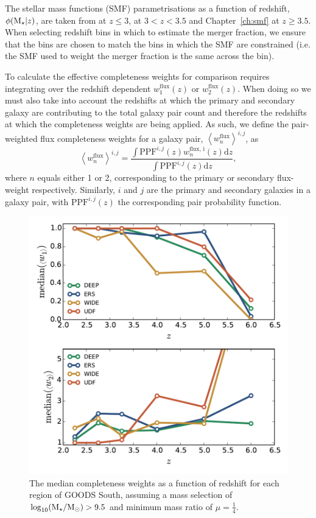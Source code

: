 The stellar mass functions (SMF) parametrisations as a function of redshift, \( \phi(\text{M}_{\star}|z) \), are taken from \citet{Mortlock:2014et} at $z \leq 3$, \citet{Santini:2012jq} at $3 < z < 3.5$ and Chapter~\ref{ch:smf} at $z \geq 3.5$. When selecting redshift bins in which to estimate the merger fraction, we ensure that the bins are chosen to match the bins in which the SMF are constrained (i.e. the SMF used to weight the merger fraction is the same across the bin).

To calculate the effective completeness weights for comparison requires integrating over the redshift dependent $w^{\text{flux}}_{1}(z)$ or $w^{\text{flux}}_{2}(z)$. When doing so we must also take into account the redshifts at which the primary and secondary galaxy are contributing to the total galaxy pair count and therefore the redshifts at which the completeness weights are being applied. As such, we define the pair-weighted flux completeness weights for a galaxy pair, $\left \langle w^{\text{flux}}_{n} \right \rangle ^{i,j}$, as
\begin{equation}
	\left \langle w^{\text{flux}}_{n} \right \rangle^{i,j} = \frac{\int \text{PPF}^{i,j}(z) w^{\text{flux, i}}_{n}(z) \text{d}z}{\int \text{PPF}^{i,j}(z) \text{d}z},
\end{equation}
where $n$ equals either 1 or 2, corresponding to the primary or secondary flux-weight respectively. Similarly, $i$ and $j$ are the primary and secondary galaxies in a galaxy pair, with  $\text{PPF}^{i,j}(z)$ the corresponding pair probability function. 

\begin{figure}
\centering
	\includegraphics[width=0.85\columnwidth]{plots/flux_weight_means_MCtests.pdf}
  \caption[The median completeness weights as a function of redshift for each region of GOODS South.]{The median completeness weights as a function of redshift for each region of GOODS South, assuming a mass selection of $\log_{10}(\text{M}_{\star} / \text{M}_{\odot}) > 9.5$ and minimum mass ratio of $\mu = \frac{1}{4}$.}
  \label{merger-fig:flux_weights_medians}
\end{figure}

